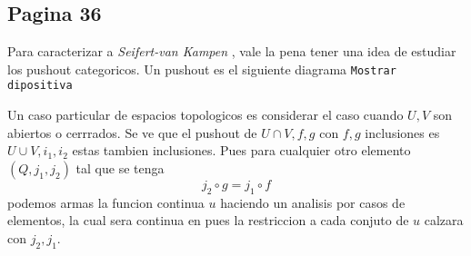\documentclass[letterpaper]{article}
\newcommand{\vank}{\emph{Seifert-van Kampen} }
\begin{document}
\subsection*{Pagina 36}
Para caracterizar a \vank , vale la pena tener una idea de estudiar los
pushout categoricos. Un pushout es el siguiente diagrama \texttt{Mostrar
  dipositiva}

Un caso particular de espacios topologicos es considerar el caso cuando
\(U,V\) son abiertos o cerrrados. Se ve que el pushout de \(U \cap V,
f, g\) con \(f,g\) inclusiones es \(U \cup V, i_1, i_2\) estas
tambien inclusiones. Pues para cualquier otro elemento \((Q, j_1, j_2)\)
tal que se tenga
\[ j_2 \circ g = j_1 \circ f\]
podemos armas la funcion continua \(u\) haciendo un analisis por casos
de elementos, la cual sera continua en pues la restriccion a cada
conjuto de \(u\) calzara con \(j_2, j_1\).

\end{document}
